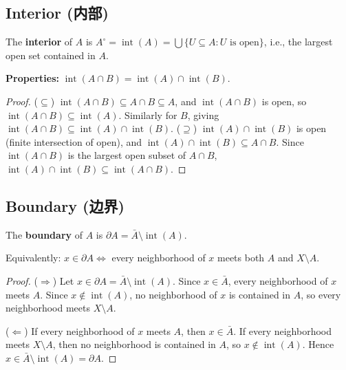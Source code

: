 \documentclass{article}
\begin{document}
\subsection{Interior (内部)}\label{def:interior}
\begin{definition}
  The \textbf{interior} of $A$ is $A^\circ = \operatorname{int}(A) =
  \bigcup\{U \subseteq A : U \text{ is open}\}$, i.e., the largest
  open set contained in $A$.
\end{definition}
\textbf{Properties:} $\operatorname{int}(A \cap B) =
\operatorname{int}(A) \cap \operatorname{int}(B)$.

\begin{proof}
  ($\subseteq$) $\operatorname{int}(A \cap B) \subseteq A \cap B \subseteq A$,
  and $\operatorname{int}(A \cap B)$ is open, so
  $\operatorname{int}(A \cap B) \subseteq \operatorname{int}(A)$.
  Similarly for $B$, giving $\operatorname{int}(A \cap B) \subseteq
  \operatorname{int}(A) \cap \operatorname{int}(B)$.
  ($\supseteq$) $\operatorname{int}(A) \cap \operatorname{int}(B)$ is
  open (finite intersection of open),
  and $\operatorname{int}(A) \cap \operatorname{int}(B) \subseteq A \cap B$.
  Since $\operatorname{int}(A \cap B)$ is the largest open subset of $A \cap B$,
  $\operatorname{int}(A) \cap \operatorname{int}(B) \subseteq
  \operatorname{int}(A \cap B)$.
\end{proof}

\subsection{Boundary (边界)}\label{def:boundary}
\begin{definition}
  The \textbf{boundary} of $A$ is $\partial A = \bar{A} \setminus
  \operatorname{int}(A)$.
\end{definition}
Equivalently: $x \in \partial A \iff$ every neighborhood of $x$ meets
both $A$ and $X \setminus A$.

\begin{proof}
  ($\Rightarrow$) Let $x \in \partial A = \bar{A} \setminus
  \operatorname{int}(A)$.
  Since $x \in \bar{A}$, every neighborhood of $x$ meets $A$.
  Since $x \notin \operatorname{int}(A)$, no neighborhood of $x$ is
  contained in $A$,
  so every neighborhood meets $X \setminus A$.

  ($\Leftarrow$) If every neighborhood of $x$ meets $A$, then $x \in \bar{A}$.
  If every neighborhood meets $X \setminus A$, then no neighborhood
  is contained in $A$,
  so $x \notin \operatorname{int}(A)$. Hence $x \in \bar{A} \setminus
  \operatorname{int}(A) = \partial A$.
\end{proof}
\end{document}
